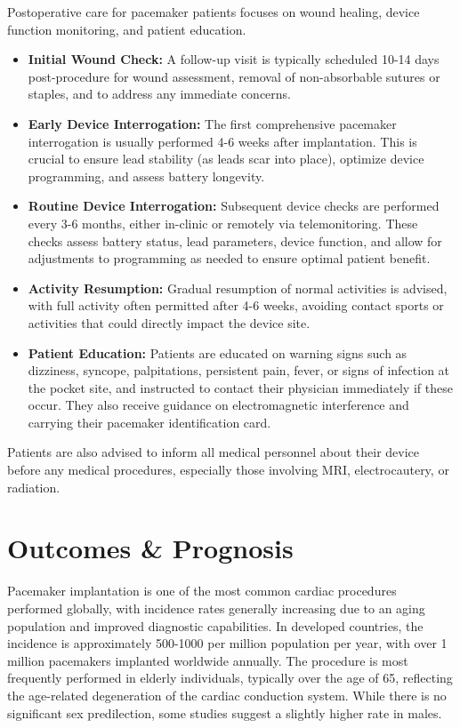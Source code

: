 Postoperative care for pacemaker patients focuses on wound healing, device function monitoring, and patient education.

\begin{itemize}
  \item \textbf{Initial Wound Check:} A follow-up visit is typically scheduled 10-14 days post-procedure for wound assessment, removal of non-absorbable sutures or staples, and to address any immediate concerns.
  \item \textbf{Early Device Interrogation:} The first comprehensive pacemaker interrogation is usually performed 4-6 weeks after implantation. This is crucial to ensure lead stability (as leads scar into place), optimize device programming, and assess battery longevity.
  \item \textbf{Routine Device Interrogation:} Subsequent device checks are performed every 3-6 months, either in-clinic or remotely via telemonitoring. These checks assess battery status, lead parameters, device function, and allow for adjustments to programming as needed to ensure optimal patient benefit.
  \item \textbf{Activity Resumption:} Gradual resumption of normal activities is advised, with full activity often permitted after 4-6 weeks, avoiding contact sports or activities that could directly impact the device site.
  \item \textbf{Patient Education:} Patients are educated on warning signs such as dizziness, syncope, palpitations, persistent pain, fever, or signs of infection at the pocket site, and instructed to contact their physician immediately if these occur. They also receive guidance on electromagnetic interference and carrying their pacemaker identification card.
\end{itemize}
Patients are also advised to inform all medical personnel about their device before any medical procedures, especially those involving MRI, electrocautery, or radiation.

\section*{Outcomes \& Prognosis}
Pacemaker implantation is one of the most common cardiac procedures performed globally, with incidence rates generally increasing due to an aging population and improved diagnostic capabilities. In developed countries, the incidence is approximately 500-1000 per million population per year, with over 1 million pacemakers implanted worldwide annually. The procedure is most frequently performed in elderly individuals, typically over the age of 65, reflecting the age-related degeneration of the cardiac conduction system. While there is no significant sex predilection, some studies suggest a slightly higher rate in males.

